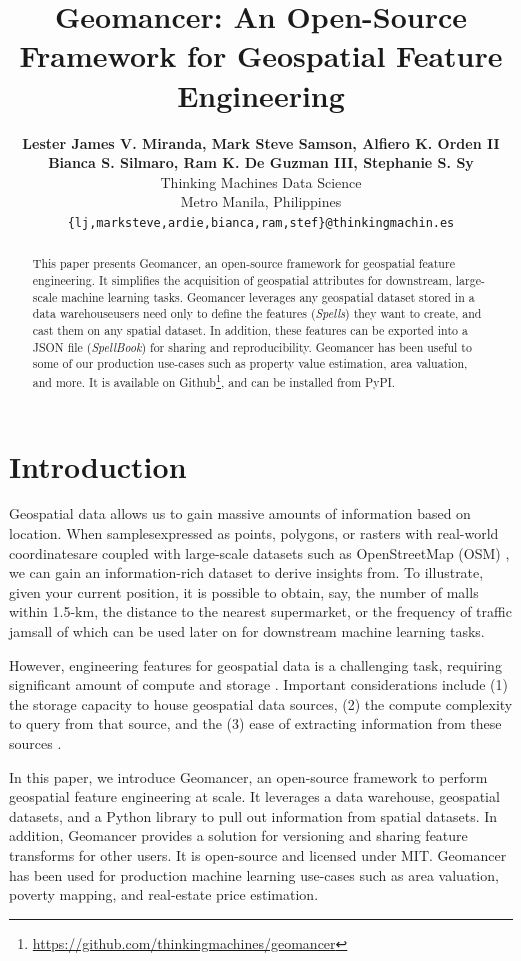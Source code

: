 \documentclass{article}
\title{Geomancer: An Open-Source Framework for Geospatial Feature Engineering}
\author{%
  \textbf{Lester James V. Miranda, Mark Steve Samson, Alfiero K. Orden II}\\
  \textbf{Bianca S. Silmaro, Ram K. De Guzman III, Stephanie S. Sy}\\
  Thinking Machines Data Science\\
  Metro Manila, Philippines\\
  \texttt{\{lj,marksteve,ardie,bianca,ram,stef\}@thinkingmachin.es} \\
}
\begin{document}
\maketitle

\begin{abstract}
    This paper presents Geomancer, an open-source framework for geospatial
    feature engineering. It simplifies the acquisition of geospatial attributes
    for downstream, large-scale machine learning tasks.  Geomancer leverages
    any geospatial dataset stored in a data warehouse\textemdash users need
    only to define the features (\textit{Spells}) they want to create, and cast
    them on any spatial dataset. In addition, these features can be exported
    into a JSON file (\textit{SpellBook}) for sharing and reproducibility.
    Geomancer has been useful to some of our production use-cases such as
    property value estimation, area valuation, and more. It is available on
    Github\footnote{\url{https://github.com/thinkingmachines/geomancer}}, and
    can be installed from PyPI.
\end{abstract}

\section{Introduction}

Geospatial data allows us to gain massive amounts of information based on
location. When samples\textemdash expressed as points, polygons, or rasters
with real-world coordinates\textemdash are coupled with large-scale datasets
such as OpenStreetMap (OSM) \cite{osm2017}, we can gain an information-rich
dataset to derive insights from. To illustrate, given your current position, it
is possible to obtain, say, the number of malls within 1.5-km, the distance to
the nearest supermarket, or the frequency of traffic jams\textemdash all of
which can be used later on for downstream machine learning tasks. 

However, engineering features for geospatial data is a challenging task,
requiring significant amount of compute and storage
\cite{nargesian2017learning, nargesian2018dataset, storcheus2015survey}.
Important considerations include (1) the storage capacity to house geospatial
data sources, (2) the compute complexity to query from that source, and the (3)
ease of extracting information from these sources \cite{klien2005requirements}. 

In this paper, we introduce Geomancer, an open-source framework to perform
geospatial feature engineering at scale. It leverages a data warehouse,
geospatial datasets, and a Python library to pull out information from spatial
datasets. In addition, Geomancer provides a solution for versioning and sharing
feature transforms for other users. It is open-source and licensed under MIT.
Geomancer has been used for production machine learning use-cases such as area
valuation, poverty mapping, and real-estate price estimation.
\end{document}
